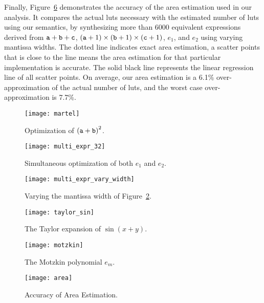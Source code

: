 Finally, Figure~\ref{so:fig:area} demonstrates the accuracy of the area
estimation used in our analysis. It compares the actual \glspl{lut} necessary
with the estimated number of \glspl{lut} using our semantics, by synthesizing
more than 6000 equivalent expressions derived from $\texttt{a} + \texttt{b} + \texttt{c}$,
$(\texttt{a} + 1) \times (\texttt{b} + 1) \times (\texttt{c} + 1)$, $e_1$, and $e_2$ using
varying mantissa widths. The dotted line indicates exact area estimation, a
scatter points that is close to the line means the area estimation for that
particular implementation is accurate. The solid black line represents the
linear regression line of all scatter points. On average, our area estimation
is a 6.1\% over-approximation of the actual number of \glspl{lut}, and the
worst case over-approximation is 7.7\%.
\newcommand{\figsize}{0.5}
\begin{figure}[ht]
    \centering
    \texttt{[image: martel]}
    \caption{Optimization of ${(\texttt{a} + \texttt{b})}^2$.}\label{so:fig:martel}
\end{figure}
\begin{figure}[ht]
    \centering
    \texttt{[image: multi\_expr\_32]}
    \caption{%
        Simultaneous optimization of both $e_1$ and $e_2$.
    }\label{so:fig:multi_expr_32}
\end{figure}
\begin{figure}[ht]
    \centering
    \texttt{[image: multi\_expr\_vary\_width]}
    \caption{%
        Varying the mantissa width of Figure~\ref{so:fig:multi_expr_32}.
    }\label{so:fig:multi_expr_vary_width}
\end{figure}
\begin{figure}[ht]
    \centering
    \texttt{[image: taylor\_sin]}
    \caption{The Taylor expansion of $\sin(x + y)$.}\label{so:fig:taylor_sin}
\end{figure}
\begin{figure}[ht]
    \centering
    \texttt{[image: motzkin]}
    \caption{The Motzkin polynomial $e_m$.}\label{so:fig:motzkin}
\end{figure}
\begin{figure}[ht]
    \centering
    \texttt{[image: area]}
    \caption{Accuracy of Area Estimation.}\label{so:fig:area}
\end{figure}
